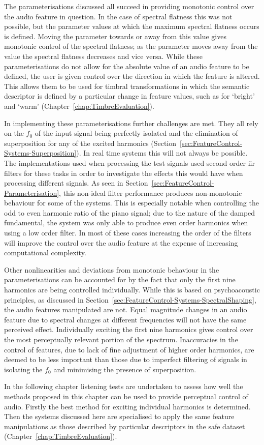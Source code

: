 	The parameterisations discussed all succeed in providing monotonic control over the audio feature in question. In
	the case of spectral flatness this was not possible, but the parameter values at which the maximum spectral
	flatness occurs is defined.  Moving the parameter towards or away from this value gives monotonic control of the
	spectral flatness; as the parameter moves away from the value the spectral flatness decreases and vice versa. While
	these parameterisations do not allow for the absolute value of an audio feature to be defined, the user is given
	control over the direction in which the feature is altered. This allows them to be used for timbral transformations
	in which the semantic descriptor is defined by a particular change in feature values, such as for `bright' and
	`warm' (Chapter~\ref{chap:TimbreEvaluation}).
	
	In implementing these parameterisations further challenges are met. They all rely on the $f_{0}$ of the input
	signal being perfectly isolated and the elimination of superposition for any of the excited harmonics
	(Section~\ref{sec:FeatureControl-Systems-Superposition}). In real time systems this will not always be possible.
	The implementations used when processing the test signals used second order \acrshort{iir} filters for these tasks
	in order to investigate the effects this would have when processing different signals. As seen in
	Section~\ref{sec:FeatureControl-Parameterisation}, this non-ideal filter performance produces non-monotonic
	behaviour for some of the systems. This is especially notable when controlling the odd to even harmonic ratio of
	the piano signal; due to the nature of the damped fundamental, the system was only able to produce even order
	harmonics when using a low order filter. In most of these cases increasing the order of the filters will improve
	the control over the audio feature at the expense of increasing computational complexity.

	Other nonlinearities and deviations from monotonic behaviour in the parameterisations can be accounted for by the
	fact that only the first nine harmonics are being controlled individually. While this is based on psychoacoustic
	principles, as discussed in Section~\ref{sec:FeatureControl-Systems-SpectralShaping}, the audio features
	manipulated are not. Equal magnitude changes in an audio feature due to spectral changes at different frequencies
	will not have the same perceived effect. Individually exciting the first nine harmonics gives control over the most
	perceptually relevant portion of the spectrum. Inaccuracies in the control of features, due to lack of fine
	adjustment of higher order harmonics, are deemed to be less important than those due to imperfect filtering of
	signals in isolating the $f_{0}$ and minimising the presence of superposition.

	In the following chapter listening tests are undertaken to assess how well the methods proposed in this chapter can
	be used to provide perceptual control of audio. Firstly the best method for exciting individual harmonics is
	determined. Then the systems discussed here are specialised to apply the same feature manipulations as those
	described by particular descriptors in the \acrshort{safe} dataset (Chapter~\ref{chap:TimbreEvaluation}).
